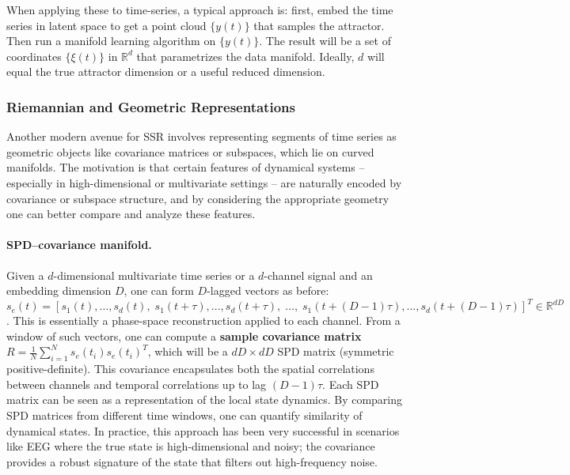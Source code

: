 \documentclass[14pt]{extarticle}
\begin{document}
	When applying these to time-series, a typical approach is: first, embed the time series in latent space to get a point cloud $\{y(t)\}$ that samples the attractor.
	Then run a manifold learning algorithm on $\{y(t)\}$.
	The result will be a set of coordinates $\{\xi(t)\}$ in $\mathbb{R}^d$ that parametrizes the data manifold.
	Ideally, $d$ will equal the true attractor dimension or a useful reduced dimension.
	
	\subsubsection{Riemannian and Geometric Representations}
	Another modern avenue for SSR involves representing segments of time series as geometric objects like covariance matrices or subspaces, which lie on curved manifolds. 
	The motivation is that certain features of dynamical systems -- especially in high-dimensional or multivariate settings -- are naturally encoded by covariance or subspace structure, and by considering the appropriate geometry one can better compare and analyze these features.
	
	\paragraph{SPD–covariance manifold.}  
	Given a $d$-dimensional multivariate time series or a $d$-channel signal and an embedding dimension $D$, one can form $D$-lagged vectors as before: $s_e(t) = [s_1(t), ..., s_d(t),\; s_1(t+\tau),...,s_d(t+\tau),\;\dots,\;s_1(t+(D-1)\tau),...,s_d(t+(D-1)\tau)]^T \in \mathbb{R}^{dD}$.
	This is essentially a phase-space reconstruction applied to each channel.
	From a window of such vectors, one can compute a \textbf{sample covariance matrix} $R = \frac{1}{N}\sum_{i=1}^N s_e(t_i) s_e(t_i)^T$, which will be a $dD \times dD$ SPD matrix (symmetric positive-definite).
	This covariance encapsulates both the spatial correlations between channels and temporal correlations up to lag $(D-1)\tau$.
	Each SPD matrix can be seen as a representation of the local state dynamics.
	By comparing SPD matrices from different time windows, one can quantify similarity of dynamical states.
	In practice, this approach has been very successful in scenarios like EEG where the true state is high-dimensional and noisy; the covariance provides a robust signature of the state that filters out high-frequency noise.
	
\end{document}
